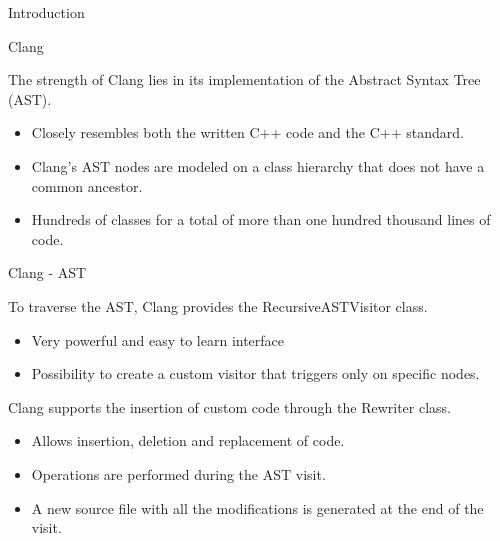 \documentclass[xcolor=dvipsnames]{beamer}
\begin{document}
\begin{section}{Introduction}
\begin{frame}{\hskip 0.3cm Clang}


The strength of Clang lies in its implementation of the Abstract Syntax Tree (AST).
\begin{itemize}

\item Closely resembles both the written C++ code and the C++ standard.

\item Clang’s AST nodes are modeled on a class hierarchy that does not have a common ancestor.

\item Hundreds of classes for a total of more than one hundred thousand lines of code.

\end{itemize}
\end{frame}
















\begin{frame}{\hskip 0.3cm Clang - AST}

To traverse the AST, Clang provides the RecursiveASTVisitor class.
\begin{itemize}

\item Very powerful and easy to learn interface

\item Possibility to create a custom visitor that triggers only on specific nodes.


\end{itemize}

Clang supports the insertion of custom code through the Rewriter class.
\begin{itemize}

\item Allows insertion, deletion and replacement of code.

\item Operations are performed during the AST visit.

\item A new source file with all the modifications is generated at the end of the visit.

\end{itemize}


\end{frame}
\end{section}
\end{document}
